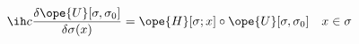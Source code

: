 \begin{equation}	\label{12.80new1}
\ih c \frac{\delta\ope{U}[\sigma,\sigma_0]}{\delta\sigma(x)}
=
\ope{H}[\sigma;x]\circ \ope{U}[\sigma,\sigma_0]
\quad
x\in\sigma
	\end{equation}

